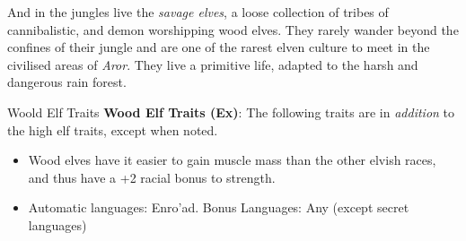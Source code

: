 And in the jungles  live the \emph{savage elves}, a loose
collection of tribes of cannibalistic, and demon worshipping wood elves. They
rarely wander beyond the confines of their jungle and are one of the rarest
elven culture to meet in the civilised areas of \emph{Aror}. They live a
primitive life, adapted to the harsh and dangerous rain forest.

\begin{35e}{Woold Elf Traits}
  \textbf{Wood Elf Traits (Ex)}: The following traits are in \emph{addition}
  to the high elf traits, except when noted.
  \begin{itemize}[noitemsep]
    \item Wood elves have it easier to gain muscle mass than the other elvish
      races, and thus have a +2 racial bonus to strength.
    \item Automatic languages: Enro'ad. Bonus Languages: Any (except secret
      languages)
  \end{itemize}
\end{35e}
